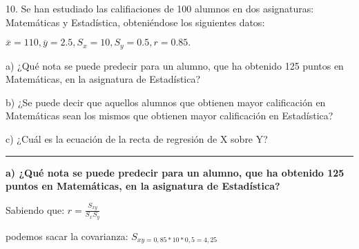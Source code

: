 \documentclass{article}
\begin{document}
%
%
%
%
%
%
%
%
%
%
%
%
%
%
%
%
%
%
%
%
%
%
%
%
%
%
%
%
%

10. Se han estudiado las califiaciones de 100 alumnos en dos asignaturas: Matem\'aticas y Estad\'istica, obteni\'endose los siguientes datos:

\(\overline{x} = 110, \overline{y} = 2.5, S_{x} = 10, S_{y} = 0.5, r = 0.85.\)

a) ¿Qu\'e nota se puede predecir para un alumno, que ha obtenido 125 puntos en Matem\'aticas, en la asignatura de Estad\'istica?

b) ¿Se puede decir que aquellos alumnos que obtienen mayor calificaci\'on en Matem\'aticas sean los mismos que obtienen mayor calificaci\'on en Estad\'istica?

c) ¿Cu\'al es la ecuaci\'on de la recta de regresi\'on de X sobre Y?

\rule{119mm}{0.2mm}

\textbf{a) ¿Qu\'e nota se puede predecir para un alumno, que ha obtenido 125 puntos en Matem\'aticas, en la asignatura de Estad\'istica?}

Sabiendo que: \(r = \frac{S_{xy}}{S_{x} S_{y}} \)

podemos sacar la covarianza: \(S_{xy = 0,85 * 10 * 0,5 = 4,25} \)
\end{document}
